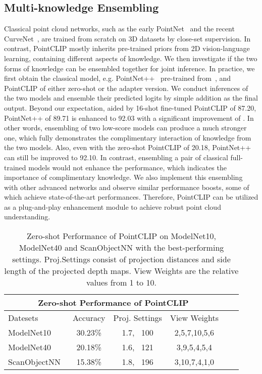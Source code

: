 \documentclass[10pt,twocolumn,letterpaper]{article}
\begin{document}
\subsection{Multi-knowledge Ensembling}
\label{m-ensemble}
Classical point cloud networks, such as the early PointNet~\cite{qi2017pointnet} and the recent CurveNet~\cite{muzahid2020curvenet}, are trained from scratch on 3D datasets by close-set supervision. In contrast, PointCLIP mostly inherits pre-trained priors from 2D vision-language learning, containing different aspects of knowledge. We then investigate if the two forms of knowledge can be ensembled together for joint inference. In practice, we first obtain the classical model, e.g. PointNet++~\cite{qi2017pointnet++} pre-trained from~\cite{simpleview2021}, and PointCLIP of either zero-shot or the adapter version. We conduct inferences of the two models and ensemble their predicted logits by simple addition as the final output. Beyond our expectation, aided by 16-shot fine-tuned PointCLIP of 87.20, PointNet++ of 89.71 is enhanced to 92.03 with a significant improvement of . In other words, ensembling of two low-score models can produce a much stronger one, which fully demonstrates the complimentary interaction of knowledge from the two models. Also, even with the zero-shot PointCLIP of 20.18, PointNet++ can still be improved to 92.10. In contrast, ensembling a pair of classical full-trained models would not enhance the performance, which indicates the importance of complimentary knowledge. We also implement this ensembling with other advanced networks and observe similar performance boosts, some of which achieve state-of-the-art performances. Therefore, PointCLIP can be utilized as a plug-and-play enhancement module to achieve robust point cloud understanding.


\begin{table}[t]
\centering
\begin{adjustbox}{width=\linewidth}
	\begin{tabular}{lccccc}
	\toprule
		\multicolumn{4}{c}{Zero-shot Performance of PointCLIP} \\ \midrule
		Datesets &Accuracy &Proj. Settings &View Weights \\
		\cmidrule(lr){1-1} \cmidrule(lr){2-2} \cmidrule(lr){3-3} \cmidrule(lr){4-4}
	    ModelNet10~\cite{wu20153d} &30.23\% &1.7, \ 100 & 2,5,7,10,5,6\\
	    ModelNet40~\cite{wu20153d}  &20.18\% &1.6, \ 121 &3,9,5,4,5,4\\
	    ScanObjectNN~\cite{uy2019revisiting} &15.38\% &1.8, \ 196 &3,10,7,4,1,0\\
	\bottomrule
	\end{tabular}
\end{adjustbox}
\caption{Zero-shot Performance of PointCLIP on ModelNet10, ModelNet40 and ScanObjectNN with the best-performing settings. Proj.Settings consist of projection distances and side length of the projected depth maps. View Weights are the relative values from 1 to 10.}
\vspace*{-7.4pt}
\label{zero-exp}
\end{table}
\end{document}
